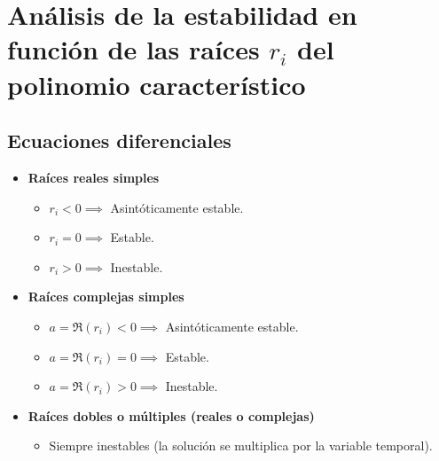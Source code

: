 \section{Análisis de la estabilidad en función de las raíces $r_i$ del polinomio característico}
\subsection*{Ecuaciones diferenciales}
\begin{itemize}
    \item \textbf{Raíces reales simples}
    \begin{itemize}
        \item $r_i < 0 \implies$ Asintóticamente estable.
        \item $r_i = 0 \implies$ Estable.
        \item $r_i > 0 \implies$ Inestable.
    \end{itemize}
    
    \item \textbf{Raíces complejas simples}
    \begin{itemize}        
        \item $a=\Re(r_i) < 0 \implies$ Asint\'oticamente estable.
        \item $a=\Re(r_i) = 0 \implies$ Estable.
        \item $a=\Re(r_i) > 0 \implies$ Inestable.
    \end{itemize}
    
    \item \textbf{Raíces dobles o múltiples (reales o complejas)}
    \begin{itemize}
        \item Siempre inestables (la solución se multiplica por la variable temporal).
    \end{itemize}
\end{itemize}

